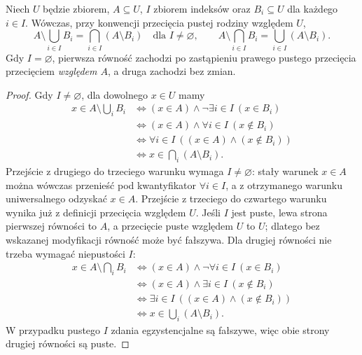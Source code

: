 \begin{twierdzenie}
\label{thm:relative-complement-families}
Niech $U$ będzie zbiorem, $A\subseteq U$,
$I$ zbiorem indeksów oraz $B_i\subseteq U$ dla każdego $i\in I$.
Wówczas, przy konwencji przecięcia pustej rodziny względem $U$,
\[
 A\setminus\bigcup_{i\in I}B_i=\bigcap_{i\in I}(A\setminus B_i)
 \quad\text{dla }I\ne\varnothing,
 \qquad
 A\setminus\bigcap_{i\in I}B_i=\bigcup_{i\in I}(A\setminus B_i).
\]
Gdy $I=\varnothing$, pierwsza równość zachodzi po zastąpieniu
prawego pustego przecięcia przecięciem \emph{względem $A$},
a druga zachodzi bez zmian.
\end{twierdzenie}
\begin{proof}
Gdy $I\ne\varnothing$, dla dowolnego $x\in U$ mamy
\begin{align*}
 x\in A\setminus\bigcup_i B_i
 &\iff (x\in A)\land\neg\exists i\in I\ (x\in B_i)\\
 &\iff (x\in A)\land\forall i\in I\ (x\notin B_i)\\
 &\iff \forall i\in I\ ((x\in A)\land(x\notin B_i))\\
 &\iff x\in\bigcap_i(A\setminus B_i).
\end{align*}
Przejście z drugiego do trzeciego warunku wymaga $I\ne\varnothing$:
stały warunek $x\in A$ można wówczas przenieść pod kwantyfikator
$\forall i\in I$, a z otrzymanego warunku uniwersalnego
odzyskać $x\in A$. Przejście z trzeciego do czwartego warunku
wynika już z definicji przecięcia względem $U$.
Jeśli $I$ jest puste, lewa strona pierwszej równości
to $A$, a przecięcie puste względem $U$ to $U$; dlatego bez
wskazanej modyfikacji równość może być fałszywa.
Dla drugiej równości nie trzeba wymagać niepustości $I$:
\begin{align*}
 x\in A\setminus\bigcap_i B_i
 &\iff (x\in A)\land\neg\forall i\in I\ (x\in B_i)\\
 &\iff (x\in A)\land\exists i\in I\ (x\notin B_i)\\
 &\iff \exists i\in I\ ((x\in A)\land(x\notin B_i))\\
 &\iff x\in\bigcup_i(A\setminus B_i).
\end{align*}
W przypadku pustego $I$ zdania egzystencjalne są fałszywe,
więc obie strony drugiej równości są puste.
\end{proof}

